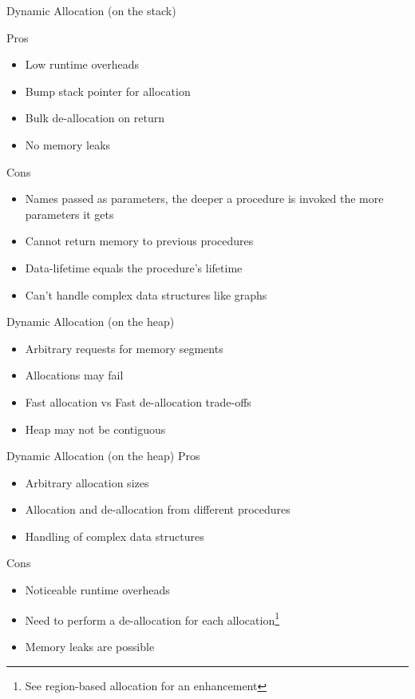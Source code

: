 \documentclass[
14pt,
aspectratio=169,
usenames,
dvipsnames,
x11names]{beamer}
\newcommand{\tik}[0]{{\color{green}\Checkmark}} %
\newcommand{\ex}[0]{{\color{red}\XSolidBrush}}  %
\begin{document}
\begin{frame}{Dynamic Allocation (on the stack)}

  Pros \tik
  \begin{itemize}  \setlength{\itemsep}{\fill}
  \item \alert{Low runtime overheads}
  \item \alert{Bump stack pointer} for allocation
  \item \alert{Bulk} de-allocation on return
  \item No \alert{memory leaks}
  \end{itemize}

  \pause

  Cons \ex
  \begin{itemize}  \setlength{\itemsep}{\fill}
  \item Names passed as parameters, the deeper a procedure is invoked \alert{the more parameters it gets}
  \item \alert{Cannot return memory} to previous procedures
  \item Data-lifetime \alert{equals} the procedure's lifetime
  \item Can't handle \alert{complex data structures} like graphs
  \end{itemize}

\end{frame}

\begin{frame}{Dynamic Allocation (on the heap)}
  \begin{itemize}  \setlength{\itemsep}{\fill}
  \item \alert{Arbitrary requests} for memory segments
  \item Allocations \alert{may fail}
  \item Fast allocation vs Fast de-allocation \alert{trade-offs}
  \item Heap may \alert{not be contiguous}
  \end{itemize}
\end{frame}

\begin{frame}{Dynamic Allocation (on the heap)}
  Pros \tik
  \begin{itemize}  \setlength{\itemsep}{\fill}
  \item \alert{Arbitrary} allocation sizes
  \item Allocation and de-allocation \alert{from different procedures}
  \item Handling of \alert{complex data structures}
  \end{itemize}

  \pause

  Cons \ex
  \begin{itemize}  \setlength{\itemsep}{\fill}
  \item Noticeable \alert{runtime overheads}
  \item Need to perform \alert{a de-allocation for each allocation}\footnote{See region-based allocation for an enhancement}
  \item \alert{Memory leaks} are possible
  \end{itemize}
\end{frame}
\end{document}
